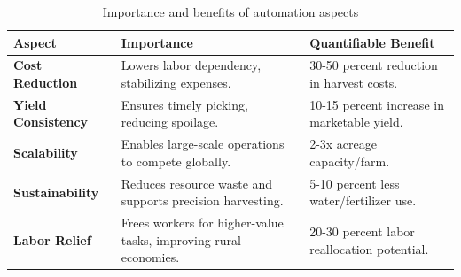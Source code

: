 \begin{table}[h]
    \centering
    \renewcommand{\arraystretch}{1.3}
    \begin{tabular}{|l|p{6cm}|p{5cm}|}
        \hline
        \textbf{Aspect} & \textbf{Importance} & \textbf{Quantifiable Benefit} \\
        \hline
        \textbf{Cost Reduction} & Lowers labor dependency, stabilizing expenses. & 30-50 percent reduction in harvest costs. \\
        \hline
        \textbf{Yield Consistency} & Ensures timely picking, reducing spoilage. & 10-15 percent increase in marketable yield. \\
        \hline
        \textbf{Scalability} & Enables large-scale operations to compete globally. & 2-3x acreage capacity/farm. \\
        \hline
        \textbf{Sustainability} & Reduces resource waste and supports precision harvesting. & 5-10 percent less water/fertilizer use. \\
        \hline
        \textbf{Labor Relief} & Frees workers for higher-value tasks, improving rural economies. & 20-30 percent labor reallocation potential. \\
        \hline
    \end{tabular}
    \caption{Importance and benefits of automation aspects}
    \label{tab:benefits}
\end{table}




